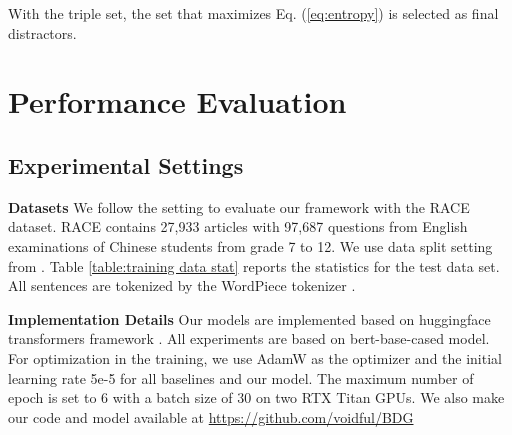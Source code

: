 \documentclass[11pt,a4paper]{article}
\begin{document}
With the triple set, the set that maximizes Eq. (\ref{eq:entropy}) is selected as final distractors.













%
 \section{Performance Evaluation}\label{sec:exp}

\subsection{Experimental Settings}

\noindent\textbf{Datasets}
We follow the setting \cite{gao2019generating} to evaluate our framework with the RACE \cite{lai2017large} dataset.
RACE contains 27,933 articles with 97,687 questions from English examinations of Chinese students from grade 7 to 12. We use data split setting from \cite{gao2019generating}. Table \ref{table:training data stat} reports the statistics for the test data set. All sentences are tokenized by the WordPiece tokenizer \cite{wu2016google}.

\noindent\textbf{Implementation Details}
Our models are implemented based on huggingface transformers framework \cite{Wolf2019HuggingFacesTS}. All experiments are based on bert-base-cased model. For optimization in the training, we use AdamW as the optimizer and the initial learning rate 5e-5 for all baselines and our model. The maximum number of epoch is set to 6 with a batch size of 30 on two RTX Titan GPUs. We also make our code and model available at \href{https://github.com/voidful/BDG}{https://github.com/voidful/BDG} 
\end{document}
